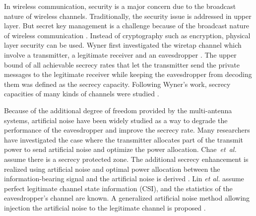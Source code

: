 \documentclass[journal]{IEEEtran}
\begin{document}
In wireless communication, security is a major concern due to the broadcast nature of wireless channels. Traditionally, the security issue is addressed in upper layer. But secret key management is a challenge because of the broadcast nature of wireless communication \cite{liang2009information}. Instead of cryptography such as encryption, physical layer security can be used. Wyner first investigated the wiretap channel which involve a transmitter, a legitimate receiver and an eavesdropper \cite{wyner1975wire}. The upper bound of all achievable secrecy rates that let the transmitter send the private messages to the legitimate receiver while keeping the eavesdropper from decoding them was defined as the secrecy capacity. Following Wyner's work, secrecy capacities of many kinds of channels were studied \cite{leung1978gaussian,liang2008secure,tekin2008general}. 

Because of the additional degree of freedom provided by the multi-antenna systems, artificial noise have been widely studied as a way to degrade the performance of the eavesdropper and improve the secrecy rate. Many researchers have investigated the case where the transmitter allocates part of the transmit power to send artificial noise and optimize the power allocation. Chae~\emph{et~al.} assume there is a secrecy protected zone. The additional secrecy enhancement is realized using artificial noise and optimal power allocation between the information-bearing signal and the artificial noise is derived \cite{chae2014enhanced}.  Lin \emph{et al.} assume perfect legitimate channel state information (CSI), and the statistics of the eavesdropper's channel are known. A generalized artificial noise method allowing injection the artificial noise to the legitimate channel is proposed \cite{lin2013secrecy}. 
\end{document}
